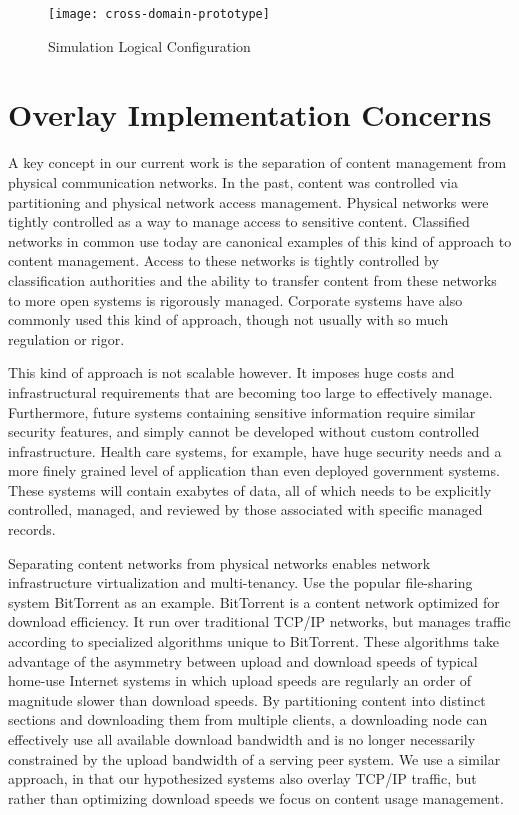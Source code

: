 \begin{figure*}[!t]
\centering
\texttt{[image: cross-domain-prototype]}
\caption{Simulation Logical Configuration}
\label{fig:model:cross-domain-prototype}
\end{figure*}

\section{Overlay Implementation Concerns}
A key concept in our current work is the separation of content management from physical communication networks.  In the past, content was controlled via partitioning and physical network access management.  Physical networks were tightly controlled as a way to manage access to sensitive content.  Classified networks in common use today are canonical examples of this kind of approach to content management.  Access to these networks is tightly controlled by classification authorities and the ability to transfer content from these networks to more open systems is rigorously managed.  Corporate systems have also commonly used this kind of approach, though not usually with so much regulation or rigor.

This kind of approach is not scalable however.  It imposes huge costs and infrastructural requirements that are becoming too large to effectively manage.  Furthermore, future systems containing sensitive information require similar security features, and simply cannot be developed without custom controlled infrastructure.  Health care systems, for example, have huge security needs and a more finely grained level of application than even deployed government systems.  These systems will contain exabytes of data, all of which needs to be explicitly controlled, managed, and reviewed by those associated with specific managed records.

Separating content networks from physical networks enables network infrastructure virtualization and multi-tenancy.  Use the popular file-sharing system BitTorrent as an example.  BitTorrent is a content network optimized for download efficiency.  It run over traditional TCP/IP networks, but manages traffic according to specialized algorithms unique to BitTorrent.  These algorithms take advantage of the asymmetry between upload and download speeds of typical home-use Internet systems in which upload speeds are regularly an order of magnitude slower than download speeds.  By partitioning content into distinct sections and downloading them from multiple clients, a downloading node can effectively use all available download bandwidth and is no longer necessarily constrained by the upload bandwidth of a serving peer system.  We use a similar approach, in that our hypothesized systems also overlay TCP/IP traffic, but rather than optimizing download speeds we focus on content usage management.

